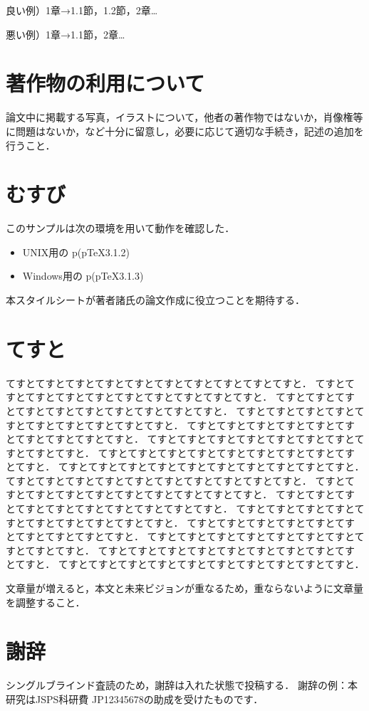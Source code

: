 \documentclass[twoside]{wiss}
\begin{document}
良い例）1章→1.1節，1.2節，2章…

悪い例）1章→1.1節，2章…

\section{著作物の利用について}
論文中に掲載する写真，イラストについて，他者の著作物ではないか，肖像権等に問題はないか，など十分に留意し，必要に応じて適切な手続き，記述の追加を行うこと．


\section{むすび}

このサンプルは次の環境を用いて動作を確認した．
\begin{itemize}
\item UNIX用の p\LaTeXe (p\TeX3.1.2)
\item Windows用の p\LaTeXe (p\TeX3.1.3)
\end{itemize}
本スタイルシートが著者諸氏の論文作成に役立つことを期待する．


\section{てすと}

てすとてすとてすとてすとてすとてすとてすとてすとてすとてすと．
てすとてすとてすとてすとてすとてすとてすとてすとてすとてすと．
てすとてすとてすとてすとてすとてすとてすとてすとてすとてすと．
てすとてすとてすとてすとてすとてすとてすとてすとてすとてすと．
てすとてすとてすとてすとてすとてすとてすとてすとてすとてすと．
てすとてすとてすとてすとてすとてすとてすとてすとてすとてすと．
てすとてすとてすとてすとてすとてすとてすとてすとてすとてすと．
てすとてすとてすとてすとてすとてすとてすとてすとてすとてすと．
てすとてすとてすとてすとてすとてすとてすとてすとてすとてすと．
てすとてすとてすとてすとてすとてすとてすとてすとてすとてすと．
てすとてすとてすとてすとてすとてすとてすとてすとてすとてすと．
てすとてすとてすとてすとてすとてすとてすとてすとてすとてすと．
てすとてすとてすとてすとてすとてすとてすとてすとてすとてすと．
てすとてすとてすとてすとてすとてすとてすとてすとてすとてすと．
てすとてすとてすとてすとてすとてすとてすとてすとてすとてすと．
てすとてすとてすとてすとてすとてすとてすとてすとてすとてすと．


文章量が増えると，本文と未来ビジョンが重なるため，重ならないように文章量を調整すること．


\section*{謝辞}
シングルブラインド査読のため，謝辞は入れた状態で投稿する．
謝辞の例：本研究はJSPS科研費 JP12345678の助成を受けたものです．
\end{document}
